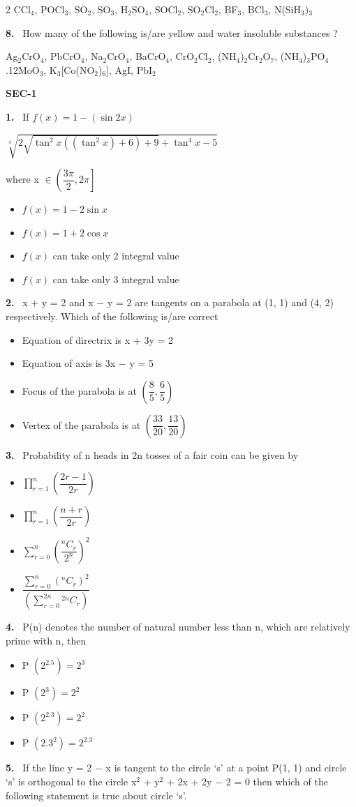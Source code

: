 \documentclass[10pt]{extarticle}
\newcommand{\partsec}[2]{\par\medskip\noindent{\large\bfseries PART-#1: #2}\par\smallskip}
\newcommand{\sect}[1]{\par\smallskip\noindent\textbf{#1}\par}
\newcommand{\qn}[1]{\par\smallskip\noindent\textbf{#1.}~}
\newenvironment{qoptions}{\begin{itemize}[leftmargin=1.8em,itemsep=1pt,topsep=2pt,label={}]}{\end{itemize}}
\newcommand{\opt}[2]{\item[(#1)] #2}
\begin{document}
\begin{multicols}{2}
$\underline{\mathrm{C}}$Cl$_4$, $\underline{\mathrm{P}}$OCl$_3$, $\underline{\mathrm{S}}$O$_2$, $\underline{\mathrm{S}}$O$_3$, H$_2\underline{\mathrm{S}}$O$_4$, $\underline{\mathrm{S}}$OCl$_2$, $\underline{\mathrm{S}}$O$_2$Cl$_2$, $\underline{\mathrm{B}}$F$_3$, $\underline{\mathrm{B}}$Cl$_3$, $\underline{\mathrm{N}}$(SiH$_3$)$_3$
\qn{8} How many of the following is/are yellow and water insoluble substances ?\par
Ag$_2$CrO$_4$, PbCrO$_4$, Na$_2$CrO$_4$, BaCrO$_4$, CrO$_2$Cl$_2$, (NH$_4$)$_2$Cr$_2$O$_7$, (NH$_4$)$_3$PO$_4$.12MoO$_3$, K$_3$[Co(NO$_2$)$_6$], AgI, PbI$_2$
\partsec{3}{MATHEMATICS}
\sect{SEC-1}
\qn{1} If $f(x) = 1 - (\sin 2x)$\par{\footnotesize$\sqrt[4]{2\sqrt{\tan^2 x((\tan^2 x) + 6) + 9} + \tan^4 x - 5}$}\par where x $\in \left(\dfrac{3\pi}{2}, 2\pi\right]$
\begin{qoptions}
\opt{A}{$f(x) = 1 - 2\sin x$}
\opt{B}{$f(x) = 1 + 2\cos x$}
\opt{C}{$f(x)$ can take only 2 integral value}
\opt{D}{$f(x)$ can take only 3 integral value}
\end{qoptions}
\qn{2} x + y = 2 and x $-$ y = 2 are tangents on a parabola at (1, 1) and (4, 2) respectively. Which of the following is/are correct
\begin{qoptions}
\opt{A}{Equation of directrix is x + 3y = 2}
\opt{B}{Equation of axis is 3x $-$ y = 5}
\opt{C}{Focus of the parabola is at $\left(\dfrac{8}{5}, \dfrac{6}{5}\right)$}
\opt{D}{Vertex of the parabola is at $\left(\dfrac{33}{20}, \dfrac{13}{20}\right)$}
\end{qoptions}
\qn{3} Probability of n heads in 2n tosses of a fair coin can be given by
\begin{qoptions}
\opt{A}{$\displaystyle\prod_{r=1}^{n}\left(\dfrac{2r - 1}{2r}\right)$}
\opt{B}{$\displaystyle\prod_{r=1}^{n}\left(\dfrac{n + r}{2r}\right)$}
\opt{C}{$\displaystyle\sum_{r=0}^{n}\left(\dfrac{{}^nC_r}{2^n}\right)^2$}
\opt{D}{$\dfrac{\displaystyle\sum_{r=0}^{n}\left({}^nC_r\right)^2}{\left(\displaystyle\sum_{r=0}^{2n}{}^{2n}C_r\right)}$}
\end{qoptions}
\qn{4} P(n) denotes the number of natural number less than n, which are relatively prime with n, then
\begin{qoptions}
\opt{A}{P $\left(2^2.5\right) = 2^3$}
\opt{B}{P $\left(2^3\right) = 2^2$}
\opt{C}{P $\left(2^2.3\right) = 2^2$}
\opt{D}{P $\left(2.3^2\right) = 2^2.3$}
\end{qoptions}
\qn{5} If the line y = 2 $-$ x is tangent to the circle `s' at a point P(1, 1) and circle `s' is orthogonal to the circle x$^2$ + y$^2$ + 2x + 2y $-$ 2 = 0 then which of the following statement is true about circle `s'.

\end{multicols}
\end{document}
